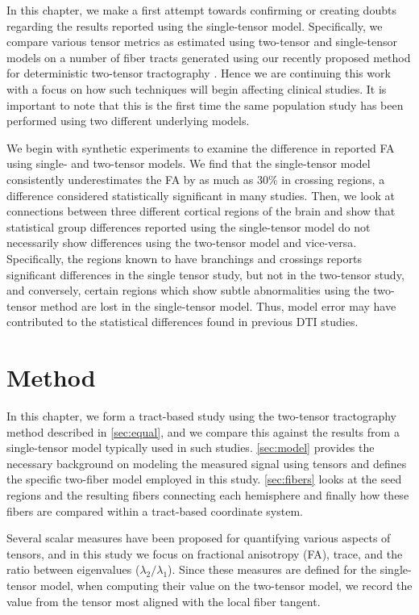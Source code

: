 \documentclass[final,hyperref]{gatech-thesis}
\begin{document}
In this chapter, we make a first attempt towards confirming or creating doubts
regarding the results reported using the single-tensor model.
%
Specifically, we compare various tensor metrics as estimated using two-tensor
and single-tensor models on a number of fiber tracts generated using our
recently proposed method for deterministic two-tensor tractography
\cite{Malcolm2009ipmi}.  Hence we are continuing this work with a focus
on how such techniques will begin affecting clinical studies.  It is important
to note that this is the first time the same population study has been
performed using two different underlying models.

We begin with synthetic experiments to examine the difference in reported FA
using single- and two-tensor models.  We find that the single-tensor model
consistently underestimates the FA by as much as 30\% in crossing regions, a
difference considered statistically significant in many studies.
%
Then, we look at connections between three different cortical regions of the
brain and show that statistical group differences reported using the
single-tensor model do not necessarily show differences using the two-tensor
model and vice-versa.  Specifically, the regions known to have branchings and
crossings reports significant differences in the single tensor study, but not
in the two-tensor study, and conversely, certain regions which show subtle
abnormalities using the two-tensor method are lost in the single-tensor model.
Thus, model error may have contributed to the statistical differences found in
previous DTI studies.


\section{Method} \label{sec:method}

In this chapter, we form a tract-based study using the two-tensor tractography
method described in \autoref{sec:equal}, and we compare this against the
results from a single-tensor model typically used in such studies.
%
\autoref{sec:model} provides the necessary background on modeling the measured
signal using tensors and defines the specific two-fiber model employed in this
study.
%
\autoref{sec:fibers} looks at the seed regions and the resulting fibers
connecting each hemisphere and finally how these fibers are compared within a
tract-based coordinate system.

Several scalar measures have been proposed for quantifying various aspects of
tensors, and in this study we focus on fractional anisotropy (FA), trace, and
the ratio between eigenvalues ($\lambda_2/\lambda_1$).  Since these measures
are defined for the single-tensor model, when computing their value on the
two-tensor model, we record the value from the tensor most aligned with the
local fiber tangent.
\end{document}
